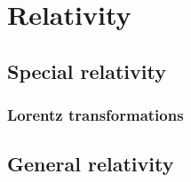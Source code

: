 \chapter{Relativity}

\section{Special relativity}
\subsection{Lorentz transformations}

\section{General relativity}
